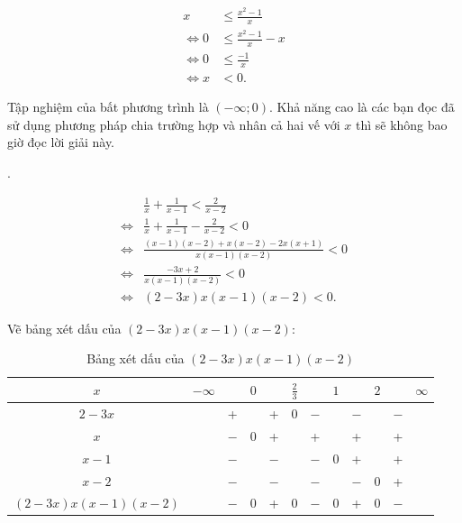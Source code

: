 \begin{align*}
   x &\leq \frac{x^2 - 1}{x} \\
   \iff 0 &\leq \frac{x^2 - 1}{x} - x \\
   \iff 0 &\leq \frac{-1}{x} \\
   \iff x &< 0.
\end{align*}

Tập nghiệm của bất phương trình là $\left(-\infty; 0\right)$. Khả năng cao là các bạn đọc đã sử dụng phương pháp chia trường hợp và nhân cả hai vế với $x$ thì sẽ không bao giờ đọc lời giải này.

. 

\begin{align*}
   &\frac{1}{x} + \frac{1}{x - 1} < \frac{2}{x - 2} \\
   \iff &\frac{1}{x} + \frac{1}{x - 1} - \frac{2}{x - 2} < 0 \\
   \iff &\frac{(x - 1)(x - 2) + x(x - 2) - 2x(x + 1)}{x(x - 1)(x - 2)} < 0 \\
   \iff &\frac{-3x + 2}{x(x - 1)(x - 2)} < 0 \\
   \iff &(2 - 3x)x(x - 1)(x - 2) < 0.
\end{align*}

Vẽ bảng xét dấu của $(2 - 3x)x(x - 1)(x - 2)$:
\begin{table}[H]
   \centering
   \begin{tabular}{|c|ccccccccccc|}
   \hline
   $x$                 & $-\infty$ &     & $0$ &     & $\frac{2}{3}$ &     & $1$ &     & $2$ &     & $\infty$ \\
   \hline
   $2-3 x$             &           &  +  &     &  +  &       0       & $-$ &     & $-$ &     & $-$ &           \\
   \hline
   $x$                 &           & $-$ &  0  &  +  &               &  +  &     &  +  &     &  +  &           \\
   \hline
   $x-1$               &           & $-$ &     & $-$ &               & $-$ &  0  &  +  &     &  +  &           \\
   \hline
   $x-2$               &           & $-$ &     & $-$ &               & $-$ &     & $-$ &  0  &  +  &           \\
   \hline
   $(2-3x)x(x-1)(x-2)$ &           & $-$ &  0  &  +  &       0       & $-$ &  0  &  +  &  0  & $-$ &           \\
   \hline
   \end{tabular}
   \caption{Bảng xét dấu của $(2 - 3x)x(x - 1)(x - 2)$}
\end{table}

